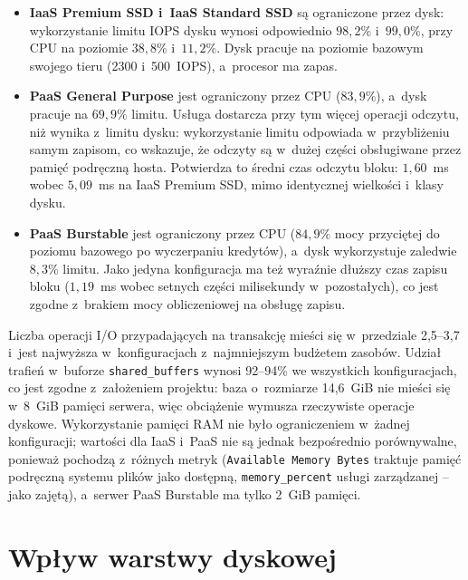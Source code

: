 \begin{itemize}
  \item \textbf{IaaS Premium SSD i~IaaS Standard SSD} są ograniczone przez dysk: wykorzystanie
  limitu IOPS dysku wynosi odpowiednio $98{,}2\%$ i~$99{,}0\%$, przy CPU na poziomie $38{,}8\%$
  i~$11{,}2\%$. Dysk pracuje na poziomie bazowym swojego tieru (2300 i~500~IOPS), a~procesor
  ma zapas.
  \item \textbf{PaaS General Purpose} jest ograniczony przez CPU ($83{,}9\%$), a~dysk pracuje
  na $69{,}9\%$ limitu. Usługa dostarcza przy tym więcej operacji odczytu, niż wynika
  z~limitu dysku: wykorzystanie limitu odpowiada w~przybliżeniu samym zapisom, co wskazuje,
  że odczyty są w~dużej części obsługiwane przez pamięć podręczną hosta. Potwierdza to
  średni czas odczytu bloku: $1{,}60$~ms wobec $5{,}09$~ms na IaaS Premium SSD, mimo
  identycznej wielkości i~klasy dysku.
  \item \textbf{PaaS Burstable} jest ograniczony przez CPU ($84{,}9\%$ mocy przyciętej do
  poziomu bazowego po wyczerpaniu kredytów), a~dysk wykorzystuje zaledwie $8{,}3\%$ limitu.
  Jako jedyna konfiguracja ma też wyraźnie dłuższy czas zapisu bloku ($1{,}19$~ms wobec
  setnych części milisekundy w~pozostałych), co jest zgodne z~brakiem mocy obliczeniowej
  na obsługę zapisu.
\end{itemize}

Liczba operacji I/O przypadających na transakcję mieści się w~przedziale 2,5--3,7 i~jest
najwyższa w~konfiguracjach z~najmniejszym budżetem zasobów. Udział trafień w~buforze
\texttt{shared\_buffers} wynosi 92--94\% we wszystkich konfiguracjach, co jest zgodne
z~założeniem projektu: baza o~rozmiarze 14,6~GiB nie mieści się w~8~GiB pamięci serwera,
więc obciążenie wymusza rzeczywiste operacje dyskowe. Wykorzystanie pamięci RAM nie było
ograniczeniem w~żadnej konfiguracji; wartości dla IaaS i~PaaS nie są jednak bezpośrednio
porównywalne, ponieważ pochodzą z~różnych metryk (\texttt{Available Memory Bytes} traktuje
pamięć podręczną systemu plików jako dostępną, \texttt{memory\_percent} usługi zarządzanej
-- jako zajętą), a~serwer PaaS Burstable ma tylko 2~GiB pamięci.

\section{Wpływ warstwy dyskowej}
\label{sec:wyniki-dysk}

